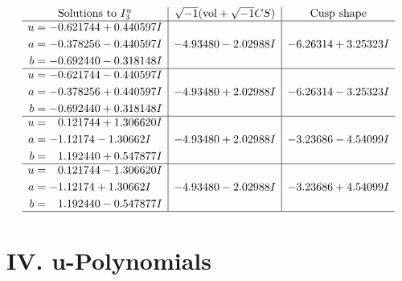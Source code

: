 \documentclass[1p]{elsarticle_modified}
\theoremstyle{definition}
\newcommand{\I}{\sqrt{-1}}
\begin{document}
$$\begin{array}{c|c|c}  
\text{Solutions to }I^u_{3}& \I (\text{vol} + \sqrt{-1}CS) & \text{Cusp shape}\\
 \hline 
\begin{aligned}
u &= -0.621744 + 0.440597 I \\
a &= -0.378256 - 0.440597 I \\
b &= -0.692440 - 0.318148 I\end{aligned}
 & -4.93480 - 2.02988 I & -6.26314 + 3.25323 I \\ \hline\begin{aligned}
u &= -0.621744 - 0.440597 I \\
a &= -0.378256 + 0.440597 I \\
b &= -0.692440 + 0.318148 I\end{aligned}
 & -4.93480 + 2.02988 I & -6.26314 - 3.25323 I \\ \hline\begin{aligned}
u &= \phantom{-}0.121744 + 1.306620 I \\
a &= -1.12174 - 1.30662 I \\
b &= \phantom{-}1.192440 + 0.547877 I\end{aligned}
 & -4.93480 + 2.02988 I & -3.23686 - 4.54099 I \\ \hline\begin{aligned}
u &= \phantom{-}0.121744 - 1.306620 I \\
a &= -1.12174 + 1.30662 I \\
b &= \phantom{-}1.192440 - 0.547877 I\end{aligned}
 & -4.93480 - 2.02988 I & -3.23686 + 4.54099 I\\
 \hline 
 \end{array}$$\newpage
\newpage\renewcommand{\arraystretch}{1}
\centering \section*{ IV. u-Polynomials}
\end{document}
